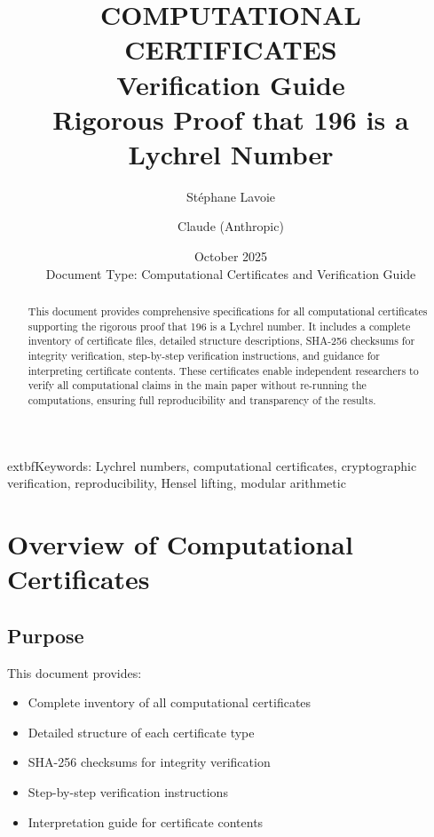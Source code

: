 \documentclass[11pt,a4paper]{article}
\title{
    \vspace{-2cm}
    \Huge\textbf{COMPUTATIONAL CERTIFICATES}\\
    \vspace{0.5cm}
    \LARGE Verification Guide\\
    \vspace{0.3cm}
    \large Rigorous Proof that 196 is a Lychrel Number
}
\author{
    \Large Stéphane Lavoie \and \Large Claude (Anthropic)
}
\date{
    \large October 2025\\
    \vspace{0.3cm}
    \normalsize Document Type: Computational Certificates and Verification Guide
}
\theoremstyle{definition}
\begin{document}
\maketitle
\thispagestyle{empty}

\begin{abstract}
\noindent
This document provides comprehensive specifications for all computational certificates supporting the rigorous proof that 196 is a Lychrel number. It includes a complete inventory of certificate files, detailed structure descriptions, SHA-256 checksums for integrity verification, step-by-step verification instructions, and guidance for interpreting certificate contents. These certificates enable independent researchers to verify all computational claims in the main paper without re-running the computations, ensuring full reproducibility and transparency of the results.
\end{abstract}

\vspace{1cm}
\noindent
\begin{sloppypar}
	extbf{Keywords:} Lychrel numbers, computational certificates, cryptographic verification, reproducibility, Hensel lifting, modular arithmetic
\end{sloppypar}

\clearpage

\tableofcontents
\clearpage

\section{Overview of Computational Certificates}

\subsection{Purpose}

This document provides:
\begin{itemize}[leftmargin=*]
    \item Complete inventory of all computational certificates
    \item Detailed structure of each certificate type
    \item SHA-256 checksums for integrity verification
    \item Step-by-step verification instructions
    \item Interpretation guide for certificate contents
\end{itemize}
\end{document}
